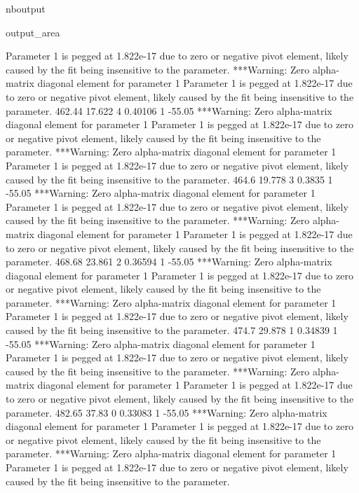\documentclass[letterpaper,10pt,english]{sphinxmanual}
\begin{document}
\begin{sphinxuseclass}{nboutput}
{\begin{sphinxuseclass}{output_area}
\begin{sphinxuseclass}{}
\begin{sphinxVerbatim}[commandchars=\\\{\}]
 Parameter 1 is pegged at 1.822e-17 due to zero or negative pivot element, likely
 caused by the fit being insensitive to the parameter.
***Warning: Zero alpha-matrix diagonal element for parameter 1
 Parameter 1 is pegged at 1.822e-17 due to zero or negative pivot element, likely
 caused by the fit being insensitive to the parameter.
          462.44      17.622    4     0.40106    1      -55.05
***Warning: Zero alpha-matrix diagonal element for parameter 1
 Parameter 1 is pegged at 1.822e-17 due to zero or negative pivot element, likely
 caused by the fit being insensitive to the parameter.
***Warning: Zero alpha-matrix diagonal element for parameter 1
 Parameter 1 is pegged at 1.822e-17 due to zero or negative pivot element, likely
 caused by the fit being insensitive to the parameter.
           464.6      19.778    3      0.3835    1      -55.05
***Warning: Zero alpha-matrix diagonal element for parameter 1
 Parameter 1 is pegged at 1.822e-17 due to zero or negative pivot element, likely
 caused by the fit being insensitive to the parameter.
***Warning: Zero alpha-matrix diagonal element for parameter 1
 Parameter 1 is pegged at 1.822e-17 due to zero or negative pivot element, likely
 caused by the fit being insensitive to the parameter.
          468.68      23.861    2     0.36594    1      -55.05
***Warning: Zero alpha-matrix diagonal element for parameter 1
 Parameter 1 is pegged at 1.822e-17 due to zero or negative pivot element, likely
 caused by the fit being insensitive to the parameter.
***Warning: Zero alpha-matrix diagonal element for parameter 1
 Parameter 1 is pegged at 1.822e-17 due to zero or negative pivot element, likely
 caused by the fit being insensitive to the parameter.
           474.7      29.878    1     0.34839    1      -55.05
***Warning: Zero alpha-matrix diagonal element for parameter 1
 Parameter 1 is pegged at 1.822e-17 due to zero or negative pivot element, likely
 caused by the fit being insensitive to the parameter.
***Warning: Zero alpha-matrix diagonal element for parameter 1
 Parameter 1 is pegged at 1.822e-17 due to zero or negative pivot element, likely
 caused by the fit being insensitive to the parameter.
          482.65       37.83    0     0.33083    1      -55.05
***Warning: Zero alpha-matrix diagonal element for parameter 1
 Parameter 1 is pegged at 1.822e-17 due to zero or negative pivot element, likely
 caused by the fit being insensitive to the parameter.
***Warning: Zero alpha-matrix diagonal element for parameter 1
 Parameter 1 is pegged at 1.822e-17 due to zero or negative pivot element, likely
 caused by the fit being insensitive to the parameter.

\end{sphinxVerbatim}
\end{sphinxuseclass}
\end{sphinxuseclass}}
\end{sphinxuseclass}
\end{document}
